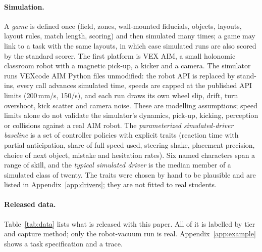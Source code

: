 \documentclass[11pt]{article}
\begin{document}
\paragraph{Simulation.} A \emph{game} is defined once (field, zones, wall-mounted fiducials, objects,
layouts, layout rules, match length, scoring) and then simulated many times; a game may link to a task
with the same layouts, in which case simulated runs are also scored by the standard scorer. The first
platform is VEX AIM, a small holonomic classroom robot with a magnetic pick-up, a kicker and a camera.
The simulator runs VEXcode AIM Python files unmodified: the robot API is replaced by stand-ins, every
call advances simulated time, speeds are capped at the published API limits (200\,mm/s,
150\textdegree/s), and each run draws its own wheel slip, drift, turn overshoot, kick scatter and
camera noise. These are modelling assumptions; speed limits alone do not validate the simulator's
dynamics, pick-up, kicking, perception or collisions against a real AIM robot. The
\emph{parameterized simulated-driver baseline} is a set of controller policies with explicit traits
(reaction time with partial anticipation, share of full speed used, steering shake, placement
precision, choice of next object, mistake and hesitation rates). Six named characters span a range of
skill, and the \emph{typical simulated driver} is the median member of a simulated class of twenty.
The traits were chosen by hand to be plausible and are listed in Appendix~\ref{app:drivers}; they are
not fitted to real students.

\paragraph{Released data.} Table~\ref{tab:data} lists what is released with this paper. All of it is
labelled by tier and capture method; only the robot-vacuum run is real. Appendix~\ref{app:example}
shows a task specification and a trace.
\end{document}
